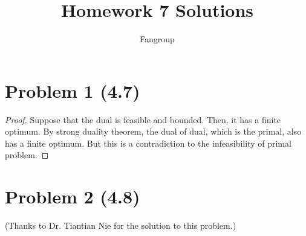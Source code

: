\documentclass[12pt]{article}
\begin{document}
 
 
\title{Homework 7 Solutions}
\author{Fangroup}
\maketitle

\section*{Problem 1 (4.7)}

\begin{proof}

Suppose that the dual is feasible and bounded. Then, it has a finite optimum. By strong duality theorem, the dual of dual, which is the primal, also has a finite optimum. But this is a contradiction to the infeasibility of primal problem.

\end{proof}

\section*{Problem 2 (4.8)}


(Thanks to Dr. Tiantian Nie for the solution to this problem.)
\end{document}
